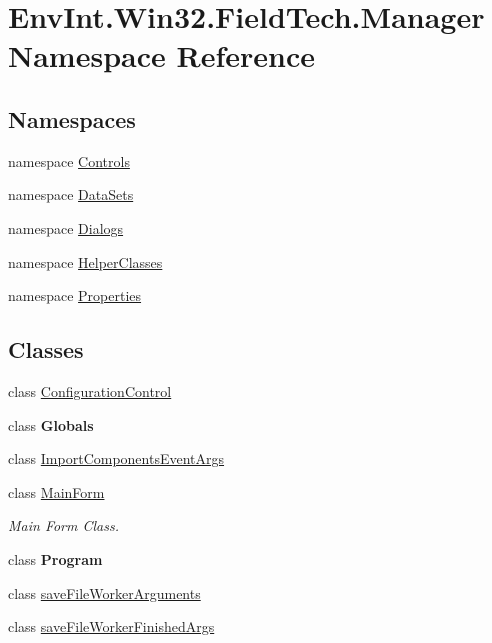 \hypertarget{namespace_env_int_1_1_win32_1_1_field_tech_1_1_manager}{}\section{Env\+Int.\+Win32.\+Field\+Tech.\+Manager Namespace Reference}
\label{namespace_env_int_1_1_win32_1_1_field_tech_1_1_manager}
\subsection*{Namespaces}
\begin{DoxyCompactItemize}
\item 
namespace \hyperlink{namespace_env_int_1_1_win32_1_1_field_tech_1_1_manager_1_1_controls}{Controls}
\item 
namespace \hyperlink{namespace_env_int_1_1_win32_1_1_field_tech_1_1_manager_1_1_data_sets}{Data\+Sets}
\item 
namespace \hyperlink{namespace_env_int_1_1_win32_1_1_field_tech_1_1_manager_1_1_dialogs}{Dialogs}
\item 
namespace \hyperlink{namespace_env_int_1_1_win32_1_1_field_tech_1_1_manager_1_1_helper_classes}{Helper\+Classes}
\item 
namespace \hyperlink{namespace_env_int_1_1_win32_1_1_field_tech_1_1_manager_1_1_properties}{Properties}
\end{DoxyCompactItemize}
\subsection*{Classes}
\begin{DoxyCompactItemize}
\item 
class \hyperlink{class_env_int_1_1_win32_1_1_field_tech_1_1_manager_1_1_configuration_control}{Configuration\+Control}
\item 
class {\bfseries Globals}
\item 
class \hyperlink{class_env_int_1_1_win32_1_1_field_tech_1_1_manager_1_1_import_components_event_args}{Import\+Components\+Event\+Args}
\item 
class \hyperlink{class_env_int_1_1_win32_1_1_field_tech_1_1_manager_1_1_main_form}{Main\+Form}
\begin{DoxyCompactList}\small\item\em Main Form Class. \end{DoxyCompactList}\item 
class {\bfseries Program}
\item 
class \hyperlink{class_env_int_1_1_win32_1_1_field_tech_1_1_manager_1_1save_file_worker_arguments}{save\+File\+Worker\+Arguments}
\item 
class \hyperlink{class_env_int_1_1_win32_1_1_field_tech_1_1_manager_1_1save_file_worker_finished_args}{save\+File\+Worker\+Finished\+Args}
\end{DoxyCompactItemize}
